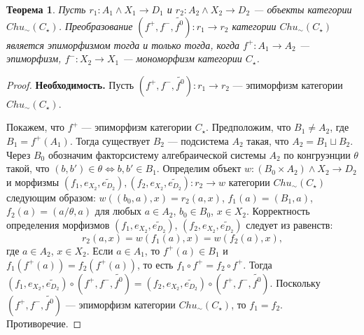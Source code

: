 \documentclass[a4paper,12pt]{article}
\newtheorem{theorem}{Теорема}
\newcommand{\fo}{\widetilde{f^0}}
\begin{document}
\begin{theorem}\label{epimorphism-c}
    Пусть $r_1: A_1 \wedge X_1 \to D_1$ и $r_2: A_2 \wedge X_2 \to D_2$ --- объекты категории $Chu_\sim(C_\star)$. Преобразование $(f^+,f^-,\fo): r_1 \to r_2$ категории $Chu_\sim(C_\star)$ является эпиморфизмом тогда и только тогда, когда $f^+: A_1 \to A_2$ --- эпиморфизм, $f^-: X_2 \to X_1$ --- мономорфизм категории $C_{\star}$.
\end{theorem}
\begin{proof}
    \textbf{Необходимость.} Пусть $(f^+,f^-,\fo): r_1 \to r_2$ --- эпиморфизм категории $Chu_\sim(C_\star)$.

    Покажем, что $f^+$ --- эпиморфизм категории $C_\star$. Предположим, что $B_1 \ne A_2$, где $B_1 = f^+(A_1)$. Тогда существует $B_2$ --- подсистема $A_2$ такая, что $A_2 = B_1 \sqcup B_2$. Через $B_0$ обозначим факторсистему алгебраической системы $A_2$ по конгруэнции $\theta$ такой, что $(b,b') \in \theta \Leftrightarrow b, b' \in B_1$. Определим объект $w: (B_0 \times A_2) \wedge X_2 \to D_2$ и морфизмы $(f_1,e_{X_2},\widetilde{e_{D_2}}), (f_2,e_{X_2},\widetilde{e_{D_2}}): r_2 \to w$ категории $Chu_\sim(C_\star)$ следующим образом: $w((b_0,a),x) = r_2(a,x)$, $f_1(a) = (B_1,a)$, $f_2(a) = (a/\theta,a)$ для любых $a \in A_2$, $b_0 \in B_0$, $x \in X_2$. Корректность определения морфизмов $(f_1,e_{X_2},\widetilde{e_{D_2}})$, $(f_2,e_{X_2},\widetilde{e_{D_2}})$ следует из равенств:
    $$
        r_2(a,x) = w(f_1(a),x) = w(f_2(a),x),
    $$
    где $a \in A_2$, $x \in X_2$. Если $a \in A_1$, то $f^+(a) \in B_1$ и $f_1(f^+(a)) = f_2(f^+(a))$, то есть $f_1 \circ f^+ = f_2 \circ f^+$. Тогда $(f_1,e_{X_2},\widetilde{e_{D_2}}) \circ (f^+,f^-,\fo) = (f_2,e_{X_2},\widetilde{e_{D_2}}) \circ (f^+,f^-,\fo)$. Поскольку $(f^+,f^-,\fo)$ --- эпиморфизм категории $Chu_\sim(C_\star)$, то $f_1 = f_2$. Противоречие.


\end{proof}
\end{document}
